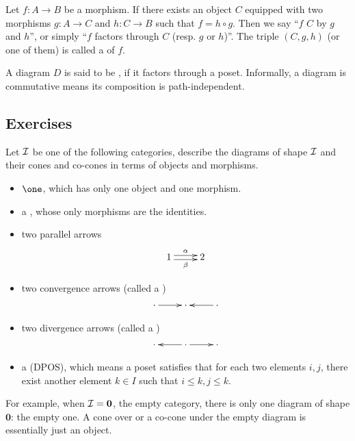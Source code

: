 \begin{defn}
  Let $f\colon A\to B$ be a morphism. If there exists an object $C$ equipped with two morphisms $g\colon A\to C$ and $h\colon C\to B$ such that $f = h\circ g$. Then we say ``$f$  $C$ by $g$ and $h$'', or simply ``$f$ factors through $C$ (resp. $g$ or $h$)''. The triple $(C,g,h)$ (or one of them) is called a  of $f$.
\end{defn}

\begin{defn}
  A diagram $D$ is said to be , if it factors through a poset. Informally, a diagram is commutative means its composition is path-independent.
\end{defn}

\subsection{Exercises}
  \begin{ex}
    Let ${\cal I}$ be one of the following categories, describe the diagrams of shape ${\cal I}$ and their cones and co-cones in terms of objects and morphisms.
    \begin{itemize}
      \item $\one$, which has only one object and one morphism.
      \item a , whose only morphisms are the identities.
      \item two parallel arrows
                     \begin{displaymath}
                           \xymatrix{
                              1\ar@<0.5ex>[r]^{\alpha}\ar@<-0.5ex>[r]_{\beta} &2
                           }
                     \end{displaymath}
      \item two convergence arrows (called a )
                \begin{displaymath}
                  \xymatrix{
                     \cdot\ar[r]&\cdot&\cdot\ar[l]
                  }
                \end{displaymath}
      \item two divergence arrows (called a )
                \begin{displaymath}
                  \xymatrix{
                     \cdot&\cdot\ar[l]\ar[r]&\cdot
                  }
                \end{displaymath}
      \item a  (DPOS), which means a poset satisfies that for each two elements $i,j$, there exist another element $k\in I$ such that $i\leqslant k,j\leqslant k$.
    \end{itemize}

    For example, when ${\cal I}=\mathbf{0}$, the empty category, there is only one diagram of shape $\mathbf{0}$: the empty one. A cone over or a co-cone under the empty diagram is essentially just an object.
  \end{ex}


